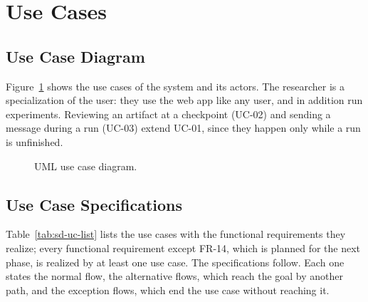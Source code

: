 \section{Use Cases}
\label{sec:sd-use-cases}

\subsection{Use Case Diagram}
\label{sec:sd-uc-diagram}
Figure~\ref{fig:sd-use-case} shows the use cases of the system and its actors. The researcher is a specialization of the user: they use the web app like any user, and in addition run experiments. Reviewing an artifact at a checkpoint (UC-02) and sending a message during a run (UC-03) extend UC-01, since they happen only while a run is unfinished.

\begin{figure}[H]
    \centering
    \resizebox{\linewidth}{!}{}
    \caption{UML use case diagram.}
    \label{fig:sd-use-case}
\end{figure}

\subsection{Use Case Specifications}
\label{sec:sd-uc-specs}
Table~\ref{tab:sd-uc-list} lists the use cases with the functional requirements they realize; every functional requirement except FR-14, which is planned for the next phase, is realized by at least one use case. The specifications follow. Each one states the normal flow, the alternative flows, which reach the goal by another path, and the exception flows, which end the use case without reaching it.


